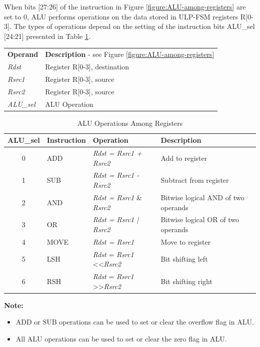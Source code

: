 \documentclass[main\_\_EN.tex]{subfiles}
\begin{document}
When bits [27:26] of the instruction in Figure \ref{figure:ALU-among-registers} are set to 0, ALU performs operations on the data stored in ULP-FSM registers R[0-3]. The types of operations depend on the setting of the instruction bits ALU\_sel [24:21] presented in Table \ref{table:ALU-among-registers}.

\begin{tabular}{ l l }
\textbf{Operand} & \textbf{Description} - see Figure \ref{figure:ALU-among-registers} \\
\textit{Rdst} & Register R[0-3], destination \\
\textit{Rsrc1} & Register R[0-3], source \\
\textit{Rsrc2} & Register R[0-3], source \\
\textit{ALU\_sel} & ALU Operation

\end{tabular}

\begin{table}[!ht ]
    \centering
    \begin{tabular}{ c l l l }
    \textbf{ALU\_sel} & \textbf{Instruction} & \textbf{Operation} & \textbf{Description} \\ \hline
    0  & ADD & \textit{ Rdst = Rsrc1 + Rsrc2 } & Add to register \\
    1  & SUB & \textit{ Rdst = Rsrc1 - Rsrc2 } & Subtract from register \\
    2  & AND & \textit{ Rdst = Rsrc1 } \& \textit{ Rsrc2 } & Bitwise logical AND of two operands  \\
    3  & OR & \textit{ Rdst = Rsrc1 | Rsrc2 } & Bitwise logical OR of two operands  \\
    4  & MOVE  & \textit{ Rdst = Rsrc1 } & Move to register  \\
    5 & LSH & \textit{Rdst} = \textit{Rsrc1} \textless\textless\textvisiblespace \textit{Rsrc2} & Bit shifting left \\
    6 & RSH & \textit{Rdst} = \textit{Rsrc1} \textgreater\textgreater\textvisiblespace \textit{Rsrc2} & Bit shifting right \\
    \end{tabular}
    \caption{ALU Operations Among Registers}
    \label{table:ALU-among-registers}
\end{table}

\textbf{Note:}
\begin{itemize}
    \item ADD or SUB operations can be used to set or clear the overflow flag in ALU.
    \item All ALU operations can be used to set or clear the zero flag in ALU.
\end{itemize}
\end{document}
